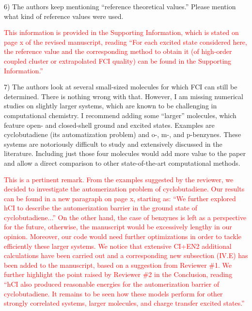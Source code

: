 \documentclass[10pt]{letter}
\newcommand{\alert}[1]{\textcolor{red}{#1}}
\begin{document}
\begin{letter}
{6) The authors keep mentioning ``reference theoretical values.'' Please mention what kind of reference values were used.
}

\alert{
This information is provided in the Supporting Information, which is stated on page x of the revised manuscript, reading
``For each excited state considered here, the reference value and the corresponding method to obtain it (of high-order coupled cluster or extrapolated FCI quality) can be found in the Supporting Information.''
}

{7) The authors look at several small-sized molecules for which FCI can still be determined. There is nothing wrong with that. However, I am missing numerical studies on slightly larger systems, which are known to be challenging in computational chemistry. I recommend adding some ``larger'' molecules, which feature open- and closed-shell ground and excited states. Examples are cyclobutadiene (its automatization problem) and o-, m-, and p-benzynes. These systems are notoriously difficult to study and extensively discussed in the literature. Including just those four molecules would add more value to the paper and allow a direct comparison to other state-of-the-art computational methods.
}

\alert{
This is a pertinent remark.
From the examples suggested by the reviewer, we decided to investigate the automerization problem of cyclobutadiene.
Our results can be found in a new paragraph on page x, starting as:
``We further explored hCI to describe the automerization barrier in the ground state of cyclobutadiene...''
On the other hand, the case of benzynes is left as a perspective for the future, otherwise, the manuscript would be excessively lengthy in our opinion.
Moreover, our code would need further optimizations in order to tackle efficiently these larger systems.
We notice that extensive CI+EN2 additional calculations have been carried out and a corresponding new subsection (IV.E) has been added to the manuscript, based on a suggestion from Reviewer \#1.
We further highlight the point raised by Reviewer \#2 in the Conclusion, reading
``hCI also produced reasonable energies for the automerization barrier of cyclobutadiene.
It remains to be seen how these models perform for other strongly correlated systems, larger molecules, and charge transfer excited states.''
}

\end{letter}
\end{document}
